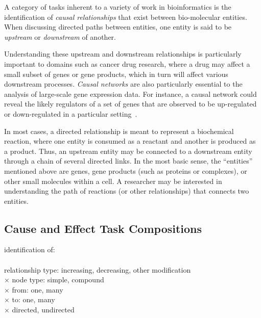 \documentclass{egpubl}
\begin{document}
A category of tasks inherent to a variety of work in bioinformatics is the identification of \textit{causal relationships} that exist between bio-molecular entities.
When discussing directed paths between entities, one entity is said to be \emph{upstream} or \emph{downstream} of another.

Understanding these upstream and downstream relationships is particularly important to domains such as cancer drug research, where a drug may affect a small subset of genes or gene products, which in turn will affect various downstream processes.
\emph{Causal networks} are also particularly essential to the analysis of large-scale gene expression data.
For instance, a causal network could reveal the likely regulators of a set of genes that are observed to be up-regulated or down-regulated in a particular setting~\cite{felciano2013predictive, Kramer2013ipa-causal}.

In most cases, a directed relationship is meant to represent a biochemical reaction, where one entity is consumed as a reactant and another is produced as a product.
Thus, an upstream entity may be connected to a downstream entity through a chain of several directed links.
In the most basic sense, the ``entities'' mentioned above are genes, gene products (such as proteins or complexes), or other small molecules within a cell.
A researcher may be interested in understanding the path of reactions (or other relationships) that connects two entities.


\subsection{Cause and Effect Task Compositions}

identification of:
\\
\\
relationship type: increasing, decreasing, other modification
\\ $\times$
node type: simple, compound
\\ $\times$
from: one, many
\\ $\times$
to: one, many
\\ $\times$
directed, undirected

\end{document}
